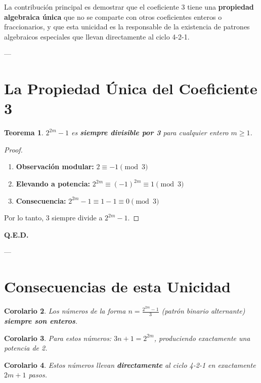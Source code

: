 \documentclass[11pt,a4paper]{article}
\newtheorem{theorem}{Teorema}[section]
\newtheorem{corollary}[theorem]{Corolario}
\begin{document}
La contribución principal es demostrar que el coeficiente 3 tiene una \textbf{propiedad algebraica única} que no se comparte con otros coeficientes enteros o fraccionarios, y que esta unicidad es la responsable de la existencia de patrones algebraicos especiales que llevan directamente al ciclo 4-2-1.

---

\section{La Propiedad Única del Coeficiente 3}

\begin{theorem}
\label{thm:divisibilidad}
\( 2^{2m} - 1 \) es \textbf{siempre divisible por 3} para cualquier entero \( m \geq 1 \).
\end{theorem}

\begin{proof}
\begin{enumerate}
    \item \textbf{Observación modular:} \( 2 \equiv -1 \pmod{3} \)
    \item \textbf{Elevando a potencia:} \( 2^{2m} \equiv (-1)^{2m} \equiv 1 \pmod{3} \)
    \item \textbf{Consecuencia:} \( 2^{2m} - 1 \equiv 1 - 1 \equiv 0 \pmod{3} \)
\end{enumerate}
Por lo tanto, 3 siempre divide a \( 2^{2m} - 1 \).
\end{proof}

\textbf{Q.E.D.}

---

\section{Consecuencias de esta Unicidad}

\begin{corollary}
Los números de la forma \( n = \frac{2^{2m} - 1}{3} \) (patrón binario alternante) \textbf{siempre son enteros}.
\end{corollary}

\begin{corollary}
Para estos números: \( 3n + 1 = 2^{2m} \), produciendo exactamente una potencia de 2.
\end{corollary}

\begin{corollary}
Estos números llevan \textbf{directamente} al ciclo 4-2-1 en exactamente \( 2m + 1 \) pasos.
\end{corollary}
\end{document}
